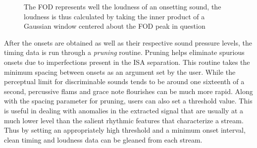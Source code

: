 \begin{figure}[thp]
  \begin{center}
    \caption{The FOD represents well the loudness of an onsetting
      sound, the loudness is thus calculated by taking the inner
      product of a Gaussian window centered about the FOD peak in question}
    \label{Loudness}
  \end{center}
\end{figure}

After the onsets are obtained as well as their respective sound pressure
levels, the timing data is run through a {\it pruning} routine. Pruning
helps eliminate spurious onsets due to imperfections present in the
ISA separation.  This routine takes the minimum spacing between onsets as
an argument set by the user. While the perceptual limit for
discriminable sounds tends to be around one sixteenth of a second,
percussive flams and grace note flourishes can be much more
rapid. Along with the spacing parameter for pruning, users can also set a
threshold value.  This is useful in dealing with anomalies
in the extracted signal that are usually at a much lower level than the salient
rhythmic features that characterize a stream.  Thus by setting an appropriately high
threshold and a minimum onset interval, clean timing and loudness data
can be gleaned from each stream.

